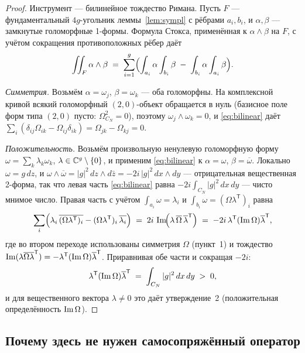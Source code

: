 \begin{proof}
Инструмент --- билинейное тождество Римана. Пусть $F$ ---
фундаментальный $4g$-угольник леммы~\ref{lem:sympl} с рёбрами
$a_i,b_i$, и $\alpha,\beta$ --- замкнутые голоморфные 1-формы. Формула
Стокса, применённая к $\alpha\wedge\beta$ на $F$, с учётом сокращения
противоположных рёбер даёт
\begin{equation}\label{eq:bilinear}
  \iint_F \alpha\wedge\beta
  \;=\;\sum_{i=1}^{g}\Bigl(
    \int_{a_i}\alpha\int_{b_i}\beta
    \;-\;\int_{b_i}\alpha\int_{a_i}\beta\Bigr).
\end{equation}

\emph{Симметрия.} Возьмём $\alpha=\omega_j$, $\beta=\omega_k$ --- оба
голоморфны. На комплексной кривой всякий голоморфный $(2,0)$-объект
обращается в нуль (базисное поле форм типа $(2,0)$ пусто:
$\Omega^2_{C_N}=0$), поэтому $\omega_j\wedge\omega_k=0$, и
\eqref{eq:bilinear} даёт
$\sum_i(\delta_{ij}\Omega_{ik}-\Omega_{ij}\delta_{ik})
=\Omega_{jk}-\Omega_{kj}=0$.

\emph{Положительность.} Возьмём произвольную ненулевую голоморфную
форму $\omega=\sum_k\lambda_k\omega_k$, $\lambda\in\mathbb{C}^g\setminus
\{0\}$, и применим \eqref{eq:bilinear} к $\alpha=\omega$,
$\beta=\overline{\omega}$. Локально $\omega=g\,dz$, и
$\omega\wedge\overline{\omega}=|g|^2\,dz\wedge d\bar z
=-2i\,|g|^2\,dx\wedge dy$ --- отрицательная вещественная 2-форма, так
что левая часть \eqref{eq:bilinear} равна
$-2i\int_{C_N}|g|^2\,dx\,dy$ --- чисто мнимое число. Правая часть с
учётом $\int_{a_i}\omega=\lambda_i$ и
$\int_{b_i}\omega=(\Omega\lambda^{\mathsf{T}})_i$ равна
\[
  \sum_i\Bigl(\lambda_i\,\overline{(\Omega\lambda^{\mathsf{T}})_i}
  -(\Omega\lambda^{\mathsf{T}})_i\,\overline{\lambda_i}\Bigr)
  \;=\;2i\,\operatorname{Im}\!\Bigl(\lambda\,\overline{\Omega}\,\overline{\lambda}^{\mathsf{T}}\Bigr)
  \;=\;-2i\,\lambda^{\mathsf{T}}(\operatorname{Im}\Omega)\overline{\lambda}^{\mathsf{T}},
\]
где во втором переходе использованы симметрия $\Omega$ (пункт~1) и
тождество
$\operatorname{Im}(\lambda\overline{\Omega}\overline{\lambda}^{\mathsf{T}})
=-\lambda^{\mathsf{T}}(\operatorname{Im}\Omega)\overline{\lambda}^{\mathsf{T}}$.
Приравнивая обе части и сокращая $-2i$:
\[
  \lambda^{\mathsf{T}}(\operatorname{Im}\Omega)\overline{\lambda}^{\mathsf{T}}
  \;=\;\int_{C_N}|g|^2\,dx\,dy\;>\;0,
\]
и для вещественного вектора $\lambda\ne0$ это даёт утверждение~2
(положительная определённость $\operatorname{Im}\Omega$).
\end{proof}

\subsection{Почему здесь не нужен самосопряжённый оператор}\label{sec:nooperator}

